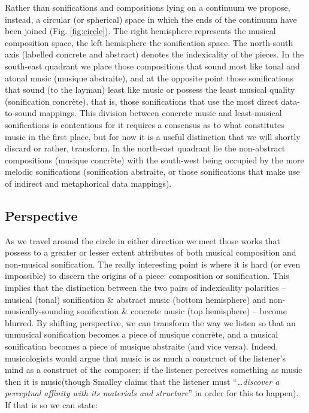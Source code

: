 \documentclass{article}
\begin{document}
Rather than sonifications and compositions lying on a continuum we propose, instead, a circular (or spherical) space in which the ends of the continuum have been joined (Fig. \ref{fig:circle}). The right hemisphere represents the musical composition space, the left hemisphere the sonification space. The north-south axis (labelled concrete and abstract) denotes the indexicality of the pieces. In the south-east quadrant we place those compositions that sound most like tonal and atonal music (musique abstraite), and at the opposite point those sonifications that sound (to the layman) least like music or possess the least musical quality (sonification concrète), that is, those sonifications that use the most direct data-to-sound mappings. This division between concrete music and least-musical sonifications is contentious for it requires a consensus as to what constitutes music in the first place, but for now it is a useful distinction that we will shortly discard or rather, transform. In the north-east quadrant lie the non-abstract compositions (musique concrète) with the south-west being occupied by the more melodic sonifications (sonification abstraite, or those sonifications that make use of indirect and metaphorical data mappings).  

\subsection{Perspective}\label{perspective}
As we travel around the circle in either direction we meet those works that possess to a greater or lesser extent attributes of both musical composition and non-musical sonification. The really interesting point is where it is hard (or even impossible) to discern the origins of a piece: composition or sonification. This implies that the distinction between the two pairs of indexicality polarities -- musical (tonal) sonification \& abstract music (bottom hemisphere) and non-musically-sounding sonification \& concrete music (top hemisphere) -- become blurred. By shifting perspective, we can transform the way we listen so that an unmusical sonification becomes a piece of musique concrète, and a musical sonification becomes a piece of musique abstraite (and vice versa). Indeed, musicologists would argue that music is as much a construct of the listener’s mind as a construct of the composer; if the listener perceives something as music then it is music(though Smalley \cite{Smalley:1986} claims that the listener must  ``\textit{…discover a perceptual affinity with its materials and structure}'' in order for this to happen). If that is so we can state:
\end{document}
